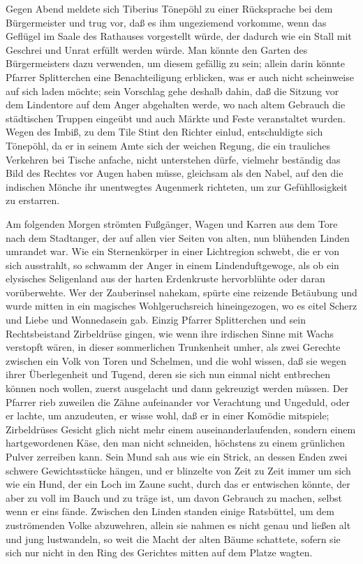 Gegen Abend meldete sich Tiberius Tönepöhl zu einer Rücksprache bei
dem Bürgermeister und trug vor, daß es ihm ungeziemend vorkomme,
wenn das Geflügel im Saale des Rathauses vorgestellt würde, der
dadurch wie ein Stall mit Geschrei und Unrat erfüllt werden würde.
Man könnte den Garten des Bürgermeisters dazu verwenden, um diesem
gefällig zu sein; allein darin könnte Pfarrer Splitterchen eine
Benachteiligung erblicken, was er auch nicht scheinweise auf sich
laden möchte; sein Vorschlag gehe deshalb dahin, daß die Sitzung
vor dem Lindentore auf dem Anger abgehalten werde, wo nach altem
Gebrauch die städtischen Truppen eingeübt und auch Märkte und Feste
veranstaltet wurden. Wegen des Imbiß, zu dem Tile Stint den Richter
einlud, entschuldigte sich Tönepöhl, da er in seinem Amte sich der
weichen Regung, die ein trauliches Verkehren bei Tische anfache,
nicht unterstehen dürfe, vielmehr beständig das Bild des Rechtes
vor Augen haben müsse, gleichsam als den Nabel, auf den die
indischen Mönche ihr unentwegtes Augenmerk richteten, um zur
Gefühllosigkeit zu erstarren.

Am folgenden Morgen strömten Fußgänger, Wagen und Karren aus dem
Tore nach dem Stadtanger, der auf allen vier Seiten von alten, nun
blühenden Linden umrandet\pagenum{[44]} war. Wie ein Sternenkörper
in einer Lichtregion schwebt, die er von sich ausstrahlt, so
schwamm der Anger in einem Lindenduftgewoge, als ob ein elysisches
Seligenland aus der harten Erdenkruste hervorblühte oder daran
vorüberwehte. Wer der Zauberinsel nahekam, spürte eine reizende
Betäubung und wurde mitten in ein magisches Wohlgeruchsreich
hineingezogen, wo es eitel Scherz und Liebe und Wonnedasein gab.
Einzig Pfarrer Splitterchen und sein Rechtsbeistand Zirbeldrüse
gingen, wie wenn ihre irdischen Sinne mit Wachs verstopft wären, in
dieser sommerlichen Trunkenheit umher, als zwei Gerechte zwischen
ein Volk von Toren und Schelmen, und die wohl wissen, daß sie wegen
ihrer Überlegenheit und Tugend, deren sie sich nun einmal nicht
entbrechen können noch wollen, zuerst ausgelacht und dann
gekreuzigt werden müssen. Der Pfarrer rieb zuweilen die Zähne
aufeinander vor Verachtung und Ungeduld, oder er lachte, um
anzudeuten, er wisse wohl, daß er in einer Komödie mitspiele;
Zirbeldrüses Gesicht glich nicht mehr einem auseinanderlaufenden,
sondern einem hartgewordenen Käse, den man nicht schneiden,
höchstens zu einem grünlichen Pulver zerreiben kann. Sein Mund sah
aus wie ein Strick, an dessen Enden zwei schwere Gewichtsstücke
hängen, und er blinzelte von Zeit zu Zeit immer um sich wie ein
Hund, der ein Loch im Zaune sucht, durch das er entwischen könnte,
der aber zu voll im Bauch und zu träge ist, um davon Gebrauch zu
machen, selbst wenn er eins fände. Zwischen den Linden standen
einige Ratsbüttel, um dem zuströmenden Volke abzuwehren, allein sie
nahmen es nicht genau und ließen alt und jung lustwandeln, so weit
die Macht der alten Bäume schattete, sofern sie sich nur nicht in
den Ring des Gerichtes mitten auf dem Platze wagten.

